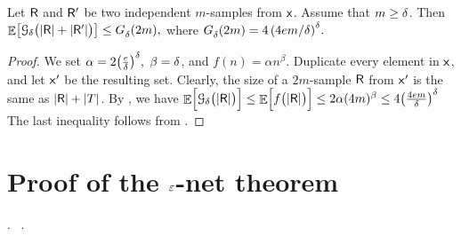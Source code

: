 \begin{lemma}
    Let $\mathsf{R}$ and $\mathsf{R}'$ be two independent $m$-samples from
    $\mathsf{x}$. Assume that $m \geq \delta$. Then
    \begin{math}
        \Ex{\bigl. \Growth{\Dim}{\bigl.\cardin{\Sample} +
              \cardin{\SampleA}} }%
        \leq%
        \fGrowX{2m},
    \end{math}
    where 
    \begin{math}
        \fGrowX{2m} = 4 \, \pth{{4 e m}/{\Dim}}^{\Dim}.
  \end{math}
\end{lemma}
\begin{proof}
    We set
    \begin{math}
        \alpha = 2 \pth{\frac{ e}{\Dim}}^\Dim,
    \end{math}
    $\beta = \delta$, and $f(n) = \alpha n^\beta$. Duplicate every
    element in $\mathsf{x}$, and let $\mathsf{x}'$ be the resulting
    set. Clearly, the size of a $2m$-sample $\mathsf{R}$ from
    $\mathsf{x}'$ is the same as $\left| {\mathsf{R}} \right| + \left| {T} \right|$.  By
    , we have
    \begin{math}
      \Ex{\Bigl. \Growth{\Dim}{\bigl.\cardin{\Sample}} }%
      \leq %
      \Ex{\Bigl. f \pth{\bigl.\cardin{\Sample}} }%
      \leq %
      2 \alpha (4m)^\beta%
      \leq%
      4 \pth{\frac{ 4em}{\Dim}}^\Dim
    \end{math}
    The last inequality follows from .
\end{proof}




\section{Proof of the ${\varepsilon}$-net theorem}

.
~\cite{hw-ensrq-87}.


